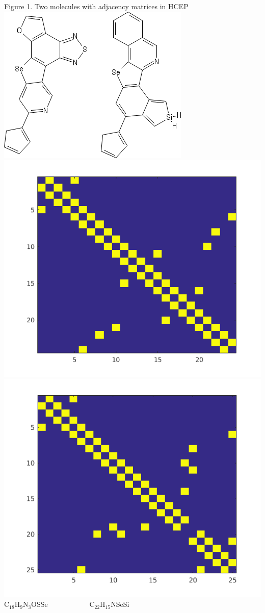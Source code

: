 \documentclass[a4paper]{article}
\begin{document}
\begin{center}
Figure 1. Two molecules with adjacency matrices in HCEP \\
	\includegraphics[scale=0.20]{sketcher2} \\
	\includegraphics[scale=0.20]{adjacency1}
	\includegraphics[scale=0.20]{adjacency2} \\
	C$_{18}$H$_9$N$_3$OSSe \ \ \ \ \ \ \ \ \ \ \ C$_{22}$H$_{15}$NSeSi
\end{center}
\end{document}
